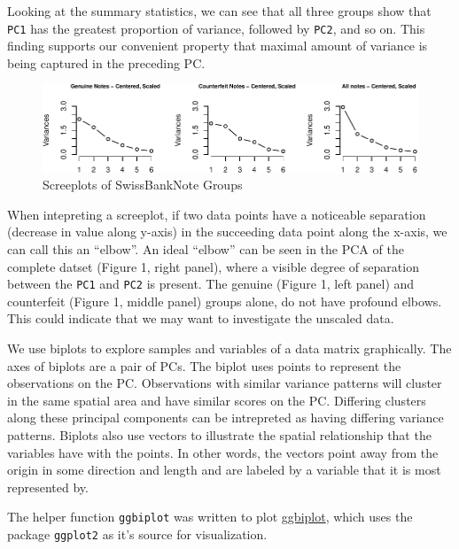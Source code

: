 \documentclass[]{article}
\begin{document}
Looking at the summary statistics, we can see that all three groups show
that \texttt{PC1} has the greatest proportion of variance, followed by
\texttt{PC2}, and so on. This finding supports our convenient property
that maximal amount of variance is being captured in the preceding PC.

\begin{figure}[htbp]
\centering
\includegraphics{sta546_hw2_files/figure-latex/unnamed-chunk-4-1.pdf}
\caption{Screeplots of SwissBankNote Groups}
\end{figure}

When intepreting a screeplot, if two data points have a noticeable
separation (decrease in value along y-axis) in the succeeding data point
along the x-axis, we can call this an ``elbow''. An ideal ``elbow'' can
be seen in the PCA of the complete datset (Figure 1, right panel), where
a visible degree of separation between the \texttt{PC1} and \texttt{PC2}
is present. The genuine (Figure 1, left panel) and counterfeit (Figure
1, middle panel) groups alone, do not have profound elbows. This could
indicate that we may want to investigate the unscaled data.

We use biplots to explore samples and variables of a data matrix
graphically. The axes of biplots are a pair of PCs. The biplot uses
points to represent the observations on the PC. Observations with
similar variance patterns will cluster in the same spatial area and have
similar scores on the PC. Differing clusters along these principal
components can be intrepreted as having differing variance patterns.
Biplots also use vectors to illustrate the spatial relationship that the
variables have with the points. In other words, the vectors point away
from the origin in some direction and length and are labeled by a
variable that it is most represented by.

The helper function \texttt{ggbiplot} was written to plot
\href{https://github.com/vqv/ggbiplot}{ggbiplot}, which uses the package
\texttt{ggplot2} as it's source for visualization.
\end{document}
